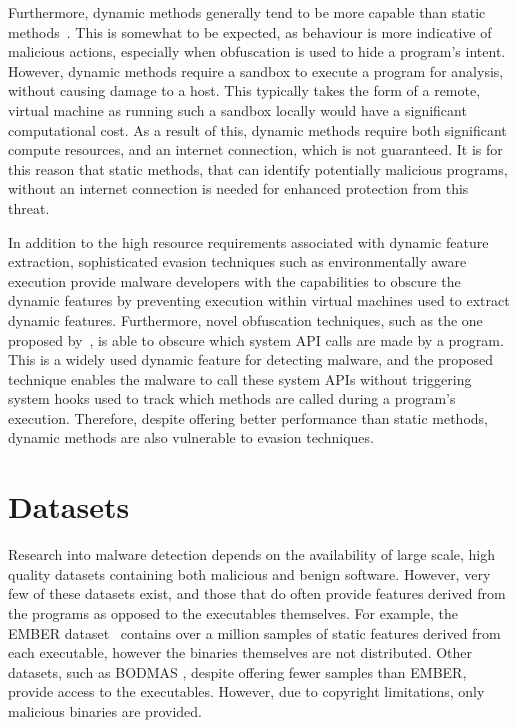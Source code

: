 \documentclass[main.tex]{subfiles}
\begin{document}
Furthermore, dynamic methods generally tend to be more capable than static methods~\citep{damodaranComparisonStaticDynamic2017}. This is somewhat to be expected, as behaviour is more indicative of malicious actions, especially when obfuscation is used to hide a program's intent. However, dynamic methods require a sandbox to execute a program for analysis, without causing damage to a host. This typically takes the form of a remote, virtual machine as running such a sandbox locally would have a significant computational cost. As a result of this, dynamic methods require both significant compute resources, and an internet connection, which is not guaranteed. It is for this reason that static methods, that can identify potentially malicious programs, without an internet connection is needed for enhanced protection from this threat. 

In addition to the high resource requirements associated with dynamic feature extraction, sophisticated evasion techniques such as environmentally aware execution provide malware developers with the capabilities to obscure the dynamic features by preventing execution within virtual machines used to extract dynamic features. Furthermore, novel obfuscation techniques, such as the one proposed by~\citep{liAPIASONovelAPI2023}, is able to obscure which system API calls are made by a program. This is a widely used dynamic feature for detecting malware, and the proposed technique enables the malware to call these system APIs without triggering system hooks used to track which methods are called during a program's execution. Therefore, despite offering better performance than static methods, dynamic methods are also vulnerable to evasion techniques.

\section{Datasets}

Research into malware detection depends on the availability of large scale, high quality datasets containing both malicious and benign software. However, very few of these datasets exist, and those that do often provide features derived from the programs as opposed to the executables themselves. For example, the EMBER dataset~\citep{andersonEMBEROpenDataset2018} contains over a million samples of static features derived from each executable, however the binaries themselves are not distributed. Other datasets, such as BODMAS \citep{yangBODMASOpenDataset2021}, despite offering fewer samples than EMBER,  provide access to the executables. However, due to copyright limitations, only malicious binaries are provided. 
\end{document}
